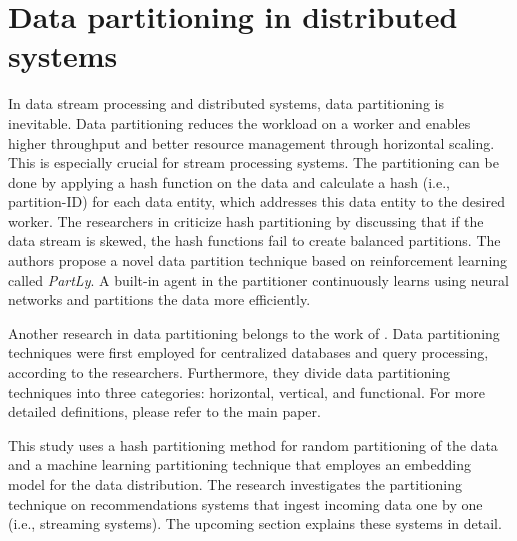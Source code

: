 \section{Data partitioning in distributed systems}
\label{sec:data-partitioning}
In data stream processing and distributed systems, data partitioning is inevitable. Data partitioning reduces the workload on a worker and enables higher throughput and better resource management through horizontal scaling. This is especially crucial for stream processing systems. The partitioning can be done by applying a hash function on the data and calculate a hash (i.e., partition-ID) for each data entity, which addresses this data entity to the desired worker. The researchers in \cite{abdelhamidPartLyLearningData2020} criticize hash partitioning by discussing that if the data stream is skewed, the hash functions fail to create balanced partitions. The authors propose a novel data partition technique based on reinforcement learning called \emph{PartLy}. A built-in agent in the partitioner continuously learns using neural networks and partitions the data more efficiently.


Another research in data partitioning belongs to the work of \cite{mahmudSurveyDataPartitioning2020}. Data partitioning techniques were first employed for centralized databases and query processing, according to the researchers. Furthermore, they divide data partitioning techniques into three categories: horizontal, vertical, and functional. For more detailed definitions, please refer to the main paper.


This study uses a hash partitioning method for random partitioning of the data and a machine learning partitioning technique that employes an embedding model for the data distribution. The research investigates the partitioning technique on recommendations systems that ingest incoming data one by one (i.e., streaming systems). The upcoming section explains these systems in detail.

